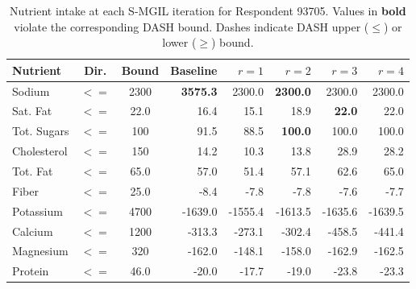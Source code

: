 \begin{table}[htbp]
\centering
\caption{Nutrient intake at each S-MGIL iteration for Respondent 93705. Values in \textbf{bold} violate the corresponding DASH bound. Dashes indicate DASH upper (\(\leq\)) or lower (\(\geq\)) bound.}
\label{tab:nutrient_intake}
\small
\begin{tabular}{lccrrrrr}
\toprule
Nutrient & Dir. & Bound & Baseline & $r=1$ & $r=2$ & $r=3$ & $r=4$ \\
\midrule
Sodium & $<=$ & 2300 & \textbf{3575.3} & 2300.0 & \textbf{2300.0} & 2300.0 & 2300.0 \\
Sat. Fat & $<=$ & 22.0 & 16.4 & 15.1 & 18.9 & \textbf{22.0} & 22.0 \\
Tot. Sugars & $<=$ & 100 & 91.5 & 88.5 & \textbf{100.0} & 100.0 & 100.0 \\
Cholesterol & $<=$ & 150 & 14.2 & 10.3 & 13.8 & 28.9 & 28.2 \\
Tot. Fat & $<=$ & 65.0 & 57.0 & 51.4 & 57.1 & 62.6 & 65.0 \\
Fiber & $<=$ & 25.0 & -8.4 & -7.8 & -7.8 & -7.6 & -7.7 \\
Potassium & $<=$ & 4700 & -1639.0 & -1555.4 & -1613.5 & -1635.6 & -1639.5 \\
Calcium & $<=$ & 1200 & -313.3 & -273.1 & -302.4 & -458.5 & -441.4 \\
Magnesium & $<=$ & 320 & -162.0 & -148.1 & -158.0 & -162.9 & -162.5 \\
Protein & $<=$ & 46.0 & -20.0 & -17.7 & -19.0 & -23.8 & -23.3 \\
\bottomrule
\end{tabular}
\end{table}